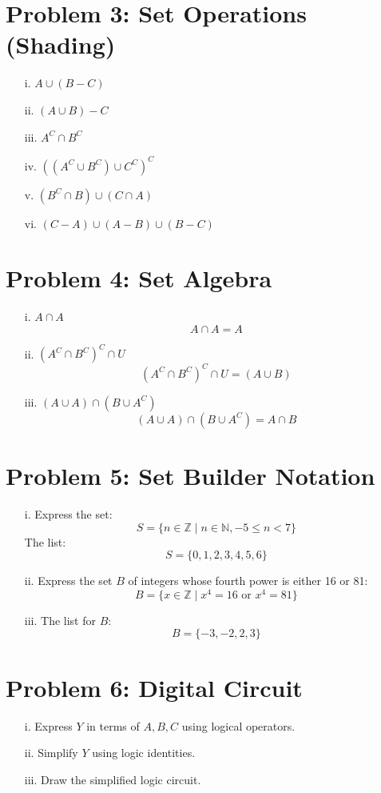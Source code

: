 \documentclass{article}
\begin{document}
\newpage
\section*{Problem 3: Set Operations (Shading)}
\begin{enumerate}
    \item[i.] \( A \cup (B - C) \)
    \item[ii.] \( (A \cup B) - C \)
    \item[iii.] \( A^C \cap B^C \)
    \item[iv.] \( ((A^C \cup B^C) \cup C^C)^C \)
    \item[v.] \( (B^C \cap B) \cup (C \cap A) \)
    \item[vi.] \( (C - A) \cup (A - B) \cup (B - C) \)
\end{enumerate}

\newpage
\section*{Problem 4: Set Algebra}
\begin{enumerate}
    \item[i.] \( A \cap A \)
    \[
    A \cap A = A
    \]
    \item[ii.] \( (A^C \cap B^C)^C \cap U \)
    \[
    (A^C \cap B^C)^C \cap U = (A \cup B)
    \]
    \item[iii.] \( (A \cup A) \cap (B \cup A^C) \)
    \[
    (A \cup A) \cap (B \cup A^C) = A \cap B
    \]
\end{enumerate}

\newpage
\section*{Problem 5: Set Builder Notation}
\begin{enumerate}
    \item[i.] Express the set:
    \[
    S = \{ n \in \mathbb{Z} \mid n \in \mathbb{N}, -5 \leq n < 7 \}
    \]
    The list:
    \[
    S = \{ 0, 1, 2, 3, 4, 5, 6 \}
    \]
    \item[ii.] Express the set \( B \) of integers whose fourth power is either 16 or 81:
    \[
    B = \{ x \in \mathbb{Z} \mid x^4 = 16 \text{ or } x^4 = 81 \}
    \]
    \item[iii.] The list for \( B \):
    \[
    B = \{ -3, -2, 2, 3 \}
    \]
\end{enumerate}

\newpage
\section*{Problem 6: Digital Circuit}
\begin{enumerate}
    \item[i.] Express \( Y \) in terms of \( A, B, C \) using logical operators.
    \item[ii.] Simplify \( Y \) using logic identities.
    \item[iii.] Draw the simplified logic circuit.
\end{enumerate}
\end{document}
